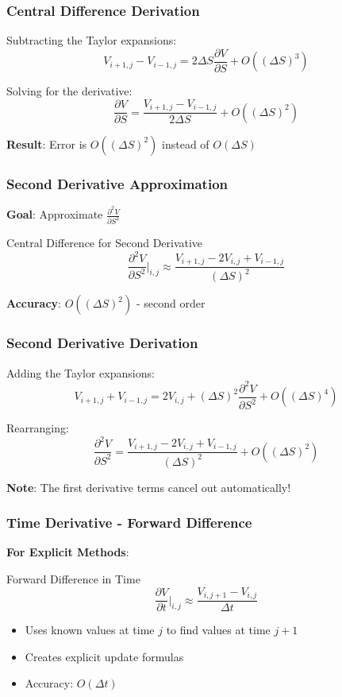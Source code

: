 \documentclass[aspectratio=169]{beamer}
\begin{document}
\begin{frame}
\frametitle{Central Difference Derivation}
Subtracting the Taylor expansions:
\[V_{i+1,j} - V_{i-1,j} = 2\Delta S \frac{\partial V}{\partial S} + O((\Delta S)^3)\]

Solving for the derivative:
\[\frac{\partial V}{\partial S} = \frac{V_{i+1,j} - V_{i-1,j}}{2\Delta S} + O((\Delta S)^2)\]

\textbf{Result}: Error is $O((\Delta S)^2)$ instead of $O(\Delta S)$
\end{frame}

\begin{frame}
\frametitle{Second Derivative Approximation}
\textbf{Goal}: Approximate $\frac{\partial^2 V}{\partial S^2}$

\begin{block}{Central Difference for Second Derivative}
\[\frac{\partial^2 V}{\partial S^2} \bigg|_{i,j} \approx \frac{V_{i+1,j} - 2V_{i,j} + V_{i-1,j}}{(\Delta S)^2}\]
\end{block}

\textbf{Accuracy}: $O((\Delta S)^2)$ - second order
\end{frame}

\begin{frame}
\frametitle{Second Derivative Derivation}
Adding the Taylor expansions:
\[V_{i+1,j} + V_{i-1,j} = 2V_{i,j} + (\Delta S)^2 \frac{\partial^2 V}{\partial S^2} + O((\Delta S)^4)\]

Rearranging:
\[\frac{\partial^2 V}{\partial S^2} = \frac{V_{i+1,j} - 2V_{i,j} + V_{i-1,j}}{(\Delta S)^2} + O((\Delta S)^2)\]

\textbf{Note}: The first derivative terms cancel out automatically!
\end{frame}

\begin{frame}
\frametitle{Time Derivative - Forward Difference}
\textbf{For Explicit Methods}:

\begin{block}{Forward Difference in Time}
\[\frac{\partial V}{\partial t} \bigg|_{i,j} \approx \frac{V_{i,j+1} - V_{i,j}}{\Delta t}\]
\end{block}

\begin{itemize}
\item Uses known values at time $j$ to find values at time $j+1$
\item Creates explicit update formulas
\item Accuracy: $O(\Delta t)$
\end{itemize}
\end{frame}
\end{document}
